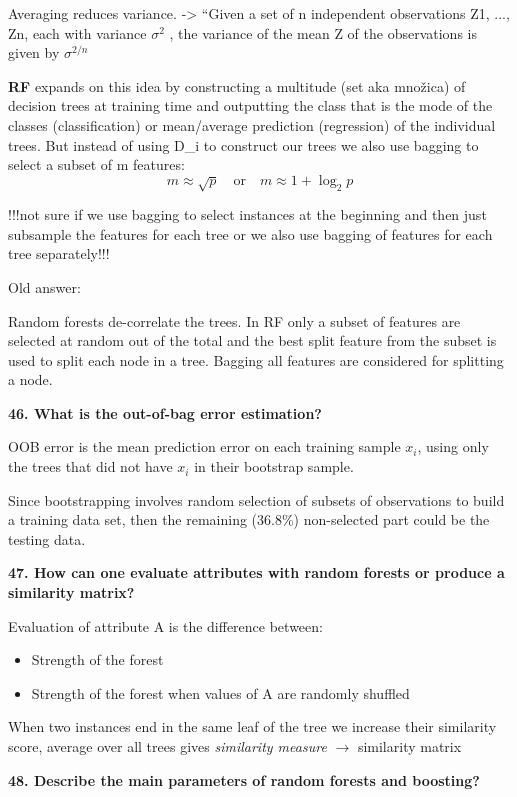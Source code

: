 Averaging reduces variance. -\textgreater{} ``Given a set of n
independent observations Z1, ..., Zn, each with variance $\sigma^2$ , the
variance of the mean Z of the observations is given by
$\sigma^{2/n}$

\textbf{RF} expands on this idea by constructing a multitude (set aka
množica) of decision trees at training time and outputting the class
that is the mode of the classes (classification) or mean/average
prediction (regression) of the individual trees. But instead of using
D\_i to construct our trees we also use bagging to select a subset of m
features:
\[ m \approx \sqrt{p} \quad \text{or} \quad m \approx 1 + \log_2 p \]

!!!not sure if we use bagging to select instances at the beginning and
then just subsample the features for each tree or we also use bagging of
features for each tree separately!!!

Old answer:

Random forests de-correlate the trees. In RF only a subset of features
are selected at random out of the total and the best split feature from
the subset is used to split each node in a tree. Bagging all features
are considered for splitting a node.

\textbf{46. What is the out-of-bag error estimation?}

OOB error is the mean prediction error on each training sample $x_i$, using
only the trees that did not have $x_i$ in their bootstrap sample.

Since bootstrapping involves random selection of subsets of observations
to build a training data set, then the remaining (36.8\%) non-selected
part could be the testing data.

\textbf{47. How can one evaluate attributes with random forests or
produce a similarity matrix?}

Evaluation of attribute A is the difference between:

\begin{itemize}
\item Strength of the forest
\item Strength of the forest when values of A are randomly shuffled
\end{itemize}

When two instances end in the same leaf of the tree we increase their
similarity score, average over all trees gives \textit{similarity measure}
$\rightarrow$ similarity matrix

\textbf{48. Describe the main parameters of random forests and
boosting?}

